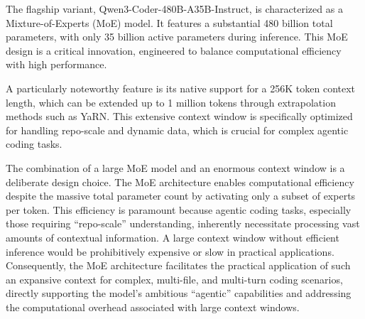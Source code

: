 The flagship variant, Qwen3-Coder-480B-A35B-Instruct, is characterized as a Mixture-of-Experts (MoE) model. It features a substantial 480 billion total parameters, with only 35 billion active parameters during inference.\cite{fortuneindia_qwen3coder_2025, qwenlm_qwen3coder_blog_2025, svenson_qwen3coder_medium_2025, apidog_qwen3coder_2025, openrouter_qwen3coder_uptime_2025, github_qwenlm_qwen3coder_2025, reddit_localllama_qwen3coder_2_2025, investing_qwen3coder_2025, reddit_localllama_qwen3coder_3_2025, marktechpost_qwen3coder_2025, youtube_qwen3coder_leading_2025, willison_qwen3coder_2025} This MoE design is a critical innovation, engineered to balance computational efficiency with high performance.\cite{apidog_qwen3coder_2025, ainvest_qwen3coder_2025}

A particularly noteworthy feature is its native support for a 256K token context length, which can be extended up to 1 million tokens through extrapolation methods such as YaRN.\cite{fortuneindia_qwen3coder_2025, qwenlm_qwen3coder_blog_2025, svenson_qwen3coder_medium_2025, apidog_qwen3coder_2025, gupta_qwen3coder_medium_2025, openrouter_qwen3coder_uptime_2025, github_qwenlm_qwen3coder_2025, reddit_localllama_qwen3coder_2_2025, investing_qwen3coder_2025, reddit_localllama_qwen3coder_3_2025, marktechpost_qwen3coder_2025, youtube_qwen3coder_leading_2025, willison_qwen3coder_2025} This extensive context window is specifically optimized for handling repo-scale and dynamic data, which is crucial for complex agentic coding tasks.\cite{qwenlm_qwen3coder_blog_2025, gupta_qwen3coder_medium_2025, marktechpost_qwen3coder_2025}

The combination of a large MoE model and an enormous context window is a deliberate design choice. The MoE architecture enables computational efficiency despite the massive total parameter count by activating only a subset of experts per token.\cite{apidog_qwen3coder_2025, ainvest_qwen3coder_2025} This efficiency is paramount because agentic coding tasks, especially those requiring ``repo-scale'' understanding, inherently necessitate processing vast amounts of contextual information.\cite{qwenlm_qwen3coder_blog_2025, svenson_qwen3coder_medium_2025, gupta_qwen3coder_medium_2025, marktechpost_qwen3coder_2025} A large context window without efficient inference would be prohibitively expensive or slow in practical applications. Consequently, the MoE architecture facilitates the practical application of such an expansive context for complex, multi-file, and multi-turn coding scenarios, directly supporting the model's ambitious ``agentic'' capabilities and addressing the computational overhead associated with large context windows.

